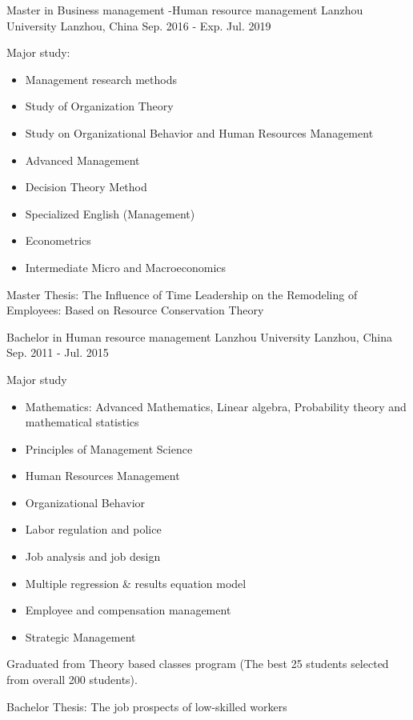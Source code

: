 \begin{cventries}
  \cventry
    {Master in Business management -Human resource management}
    {Lanzhou University}
    {Lanzhou, China}
    {Sep. 2016 - Exp. Jul. 2019}
    {
      \begin{cvitems}
        \item {
            Major study:
            \begin{itemize}
                \item Management research methods
		\item Study of Organization Theory
		\item Study on Organizational Behavior and Human Resources Management
                \item Advanced Management
		\item Decision Theory Method
		\item Specialized English (Management)
		\item Econometrics
		\item Intermediate Micro and Macroeconomics
	    \end{itemize}
        }
        \item {Master Thesis: The Influence of Time Leadership on the Remodeling of Employees: Based on Resource Conservation Theory}
      \end{cvitems}
    }
    \cventry
    {Bachelor in Human resource management}
    {Lanzhou University}
    {Lanzhou, China}
    {Sep. 2011 - Jul. 2015}
    {
      \begin{cvitems}
        \item {
            Major study
            \begin{itemize}
		\item Mathematics: Advanced Mathematics, Linear algebra, Probability theory and mathematical statistics 
		\item Principles of Management Science
                \item Human Resources Management
                \item Organizational Behavior
		\item Labor regulation and police
		\item Job analysis and job design
		\item Multiple regression \& results equation model
		\item Employee and compensation management
                \item Strategic Management            
	    \end{itemize}
        }
        \item {Graduated from Theory based classes program (The best 25 students selected from overall 200 students).}
        \item {Bachelor Thesis: The job prospects of low-skilled workers}
      \end{cvitems}
    }
\end{cventries}
